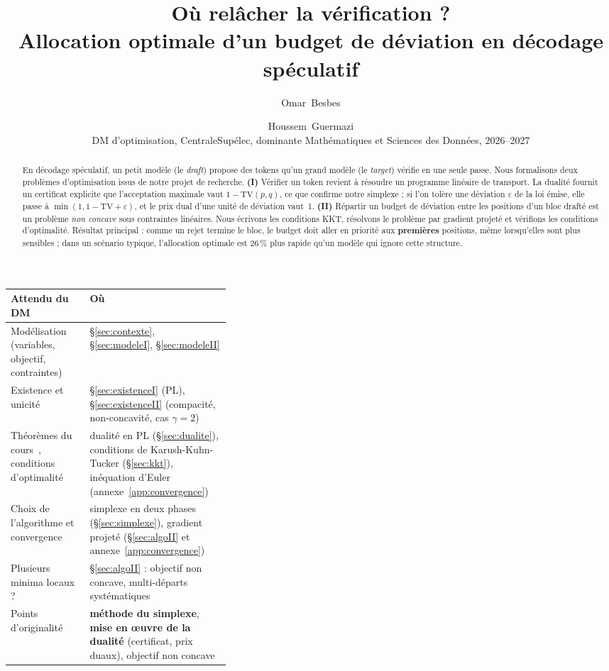 \documentclass[11pt,a4paper]{article}
\title{\textbf{Où relâcher la vérification ?}\\[2pt]
\large Allocation optimale d'un budget de déviation en décodage spéculatif}
\author{Omar~Besbes \and Houssem~Guermazi\\[2pt]
\small DM d'optimisation, CentraleSupélec, dominante Mathématiques et Sciences des Données, 2026--2027}
\date{}
\newcommand{\TV}{\mathrm{TV}}
\theoremstyle{plain}
\theoremstyle{definition}
\begin{document}
\maketitle

\begin{abstract}
En décodage spéculatif, un petit modèle (le \emph{draft}) propose des tokens qu'un grand modèle (le \emph{target}) vérifie en une seule passe.
Nous formalisons deux problèmes d'optimisation issus de notre projet de recherche.
\textbf{(I)} Vérifier un token revient à résoudre un programme linéaire de transport. La dualité fournit un certificat explicite que l'acceptation maximale vaut $1-\TV(p,q)$, ce que confirme notre simplexe ; si l'on tolère une déviation $\varepsilon$ de la loi émise, elle passe à $\min(1,1-\TV+\varepsilon)$, et le prix dual d'une unité de déviation vaut~1.
\textbf{(II)} Répartir un budget de déviation entre les positions d'un bloc drafté est un problème \emph{non concave} sous contraintes linéaires. Nous écrivons les conditions KKT, résolvons le problème par gradient projeté et vérifions les conditions d'optimalité.
Résultat principal : comme un rejet termine le bloc, le budget doit aller en priorité aux \textbf{premières} positions, même lorsqu'elles sont plus sensibles ; dans un scénario typique, l'allocation optimale est 26\,\% plus rapide qu'un modèle qui ignore cette structure.
\end{abstract}

\begin{center}
\small
\begin{tabularx}{\linewidth}{@{}>{\raggedright}p{0.36\linewidth}X@{}}
\toprule
\textbf{Attendu du DM} & \textbf{Où} \\\midrule
Modélisation (variables, objectif, contraintes) & §\ref{sec:contexte}, §\ref{sec:modeleI}, §\ref{sec:modeleII}\\
Existence et unicité & §\ref{sec:existenceI} (PL), §\ref{sec:existenceII} (compacité, non-concavité, cas $\gamma=2$)\\
Théorèmes du cours~\cite{allaire}, conditions d'optimalité & dualité en PL (§\ref{sec:dualite}), conditions de Karush-Kuhn-Tucker (§\ref{sec:kkt}), inéquation d'Euler (annexe~\ref{app:convergence})\\
Choix de l'algorithme et convergence & simplexe en deux phases (§\ref{sec:simplexe}), gradient projeté (§\ref{sec:algoII} et annexe~\ref{app:convergence})\\
Plusieurs minima locaux ? & §\ref{sec:algoII} : objectif non concave, multi-départs systématiques\\
Points d'originalité & \textbf{méthode du simplexe}, \textbf{mise en œuvre de la dualité} (certificat, prix duaux), objectif non concave\\
\bottomrule
\end{tabularx}
\end{center}
\end{document}
